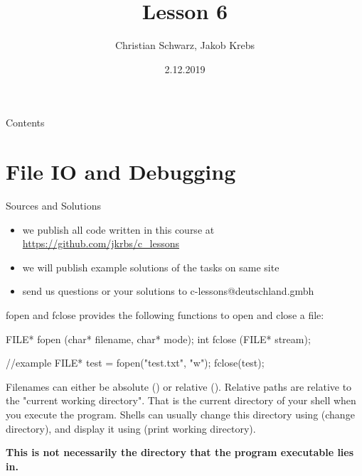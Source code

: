 \documentclass[10pt,graphics,aspectratio=169,table]{beamer}
\title{Lesson 6}
\author{Christian Schwarz, Jakob Krebs}
\date{2.12.2019}
\begin{document}
\maketitle

\begin{frame}{Contents}
    \tableofcontents
\end{frame}


\section{File IO and Debugging}
\begin{frame}{Sources and Solutions}
    \begin{itemize}
        \item we publish all code written in this course at \url{https://github.com/jkrbs/c_lessons}
        \item we will publish example solutions of the tasks on same site
        \item send us questions or your solutions to c-lessons@deutschland.gmbh
    \end{itemize}
\end{frame}

\begin{frame}[fragile]{fopen and fclose}
     provides the following functions to open and close a file:

    \begin{codeblock}
FILE* fopen (char* filename, char* mode);
int fclose (FILE* stream);

//example
FILE* test = fopen("test.txt", "w");
fclose(test);
    \end{codeblock}

    Filenames can either be absolute () 
    or relative (). 
    Relative paths are relative to the "current working directory".
    That is the current directory of your shell when you execute the program.
    Shells can usually change this directory using  (change directory), 
    and display it using  (print working directory).


    \textbf{This is not necessarily the directory that the program executable lies in.}  
\end{frame}
    
\end{document}
